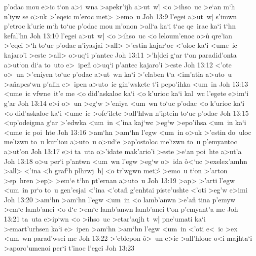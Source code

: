 p'odac
mou
e>ic
t`on
a>i~wna
>apekr'ijh
a>ut~w|\r{}
<o
>ihso~uc
>e`an
m`h
n'iyw
se
o>uk
>'eqeic
m'eroc
met>
>emo~u\bibvsend
\vs Joh 13:9
l'egei
a>ut~w|
s'imwn
p'etroc
k'urie
m`h
to`uc
p'odac
mou
m'onon
>all`a
ka`i
t`ac
qe~irac
ka`i
t`hn
kefal'hn\bibvsend
\vs Joh 13:10
l'egei
a>ut~w|
<o
>ihso~uc
<o
leloum'enoc
o>u\r{}
qre'ian
>'eqei
>`h
to`uc
p'odac
n'iyasjai
>all>
>'estin
kajar`oc
<'oloc
ka`i
<ume~ic
kajaro'i
>este
>all>
o>uq`i
p'antec\bibvsend
\vs Joh 13:11
>'h|dei
g`ar
t`on
paradid'onta
a>ut`on
di`a
to~uto
e>~ipe\r{n}
o>uq`i
p'antec
kajaro'i
>este\bibvsend
\vs Joh 13:12
<'ote
o>~un
>'eniyen
to`uc
p'odac
a>ut~wn
ka`i
>'elaben
t`a
<im'atia
a>uto~u
>a\r{n}apes`wn
p'alin
e>~ipen
a>uto~ic
gin'wskete
t'i
pepo'ihka
<um~in\bibvsend
\vs Joh 13:13
<ume~ic
vfwne~it'e
me
<o
did'askaloc
ka`i
<o
k'urioc
ka`i
kal~wc
l'egete
e>im`i
g'ar\bibvsend
\vs Joh 13:14
e>i
o>~un
>eg`w
>'eniya
<um~wn
to`uc
p'odac
<o
k'urioc
ka`i
<o
did'askaloc
ka`i
<ume~ic
>ofe'ilete
>all'hlwn
n'iptein
to`uc
p'odac\bibvsend
\vs Joh 13:15
<up'odeigma
g`ar
>'edwka
<um~in
<'ina
kaj`wc
>eg`w
>epo'ihsa
<um~in
ka`i
<ume~ic
poi~hte\bibvsend
\vs Joh 13:16
>am`hn
>am`hn
l'egw
<um~in
o>uk
>'estin
do~uloc
me'izwn
to~u
kur'iou
a>uto~u
o>ud`e
>ap'ostoloc
me'izwn
to~u
p'emyantoc
a>ut'on\bibvsend
\vs Joh 13:17
e>i
ta~uta
o>'idate
mak'ario'i
>este
>e`an
poi~hte
a>ut'a\bibvsend
\vs Joh 13:18
o>u
per`i
p'antwn
<um~wn
l'egw
>eg`w
o>~ida
\r{o}<`uc
>exelex'amhn
>all>
<'ina
<h
graf`h
plhrwj~h|
<o
tr'wgwn
met>\r{}
>emo~u
t`on
>'arton
>ep~hren
>ep>
>em`e
t`hn
pt'ernan
a>uto~u\bibvsend
\vs Joh 13:19
>ap>
>'arti
l'egw
<um~in
pr`o
to~u
gen'esjai
<'ina
<'otan\r{}
g'enhtai
piste'ushte
<'oti
>eg'w
e>imi\bibvsend
\vs Joh 13:20
>am`hn
>am`hn
l'egw
<um~in
<o
lamb'anwn
>e'a\r{n}
tina
p'emyw
>em`e
lamb'anei
<o
d`e
>em`e
lamb'anwn
lamb'anei
t`on
p'emyant'a
me\bibvsend
\vs Joh 13:21
ta~uta
e>ip`wn
<o
>ihso~uc
>etar'aqjh
t~w|
pne'umati
ka`i
>emart'urhsen
ka`i
e>~ipen
>am`hn
>am`hn
l'egw
<um~in
<'oti
e<~ic
>ex
<um~wn
parad'wsei
me\bibvsend
\vs Joh 13:22
>'eblepon
\r{o}>~un
e>ic
>all'hlouc
o<i
majhta`i
>aporo'umenoi
per`i
t'inoc
l'egei\bibvsend
\vs Joh 13:23
